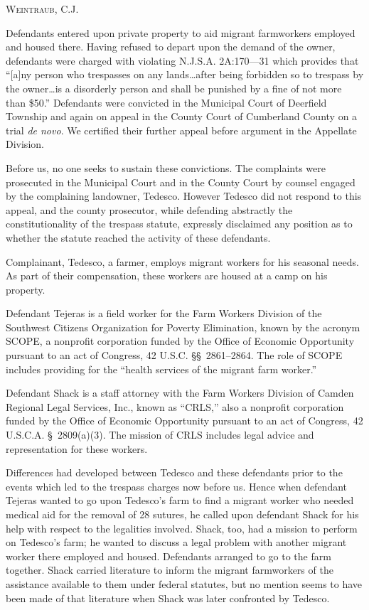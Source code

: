 
\opinion \textsc{Weintraub}, C.J.

Defendants entered upon private property to aid migrant farmworkers employed and
housed there. Having refused to depart upon the demand of the owner, defendants
were charged with violating N.J.S.A. 2A:170---31 which provides that ``[a]ny
person who trespasses on any lands\ldots after being forbidden so to trespass
by the owner\ldots is a disorderly person and shall be punished by a fine of
not more than \$50.'' Defendants were convicted in the Municipal Court of
Deerfield Township and again on appeal in the County Court of Cumberland County
on a trial \textit{de novo}. We certified their further appeal before argument
in the Appellate Division.

Before us, no one seeks to sustain these convictions. The complaints were
prosecuted in the Municipal Court and in the County Court by counsel engaged by
the complaining landowner, Tedesco. However Tedesco did not respond to this
appeal, and the county prosecutor, while defending abstractly the
constitutionality of the trespass statute, expressly disclaimed any position as
to whether the statute reached the activity of these defendants.

Complainant, Tedesco, a farmer, employs migrant workers for his seasonal needs.
As part of their compensation, these workers are housed at a camp on his
property.

Defendant Tejeras is a field worker for the Farm Workers Division of the
Southwest Citizens Organization for Poverty Elimination, known by the acronym
SCOPE, a nonprofit corporation funded by the Office of Economic Opportunity
pursuant to an act of Congress, 42 U.S.C. \S\S~2861--2864. The role of
SCOPE includes providing for the ``health services of the migrant farm
worker.''

Defendant Shack is a staff attorney with the Farm Workers Division of Camden
Regional Legal Services, Inc., known as ``CRLS,'' also a nonprofit corporation
funded by the Office of Economic Opportunity pursuant to an act of Congress, 42
U.S.C.A. \S~2809(a)(3). The mission of CRLS includes legal advice and
representation for these workers.

Differences had developed between Tedesco and these defendants prior to the
events which led to the trespass charges now before us. Hence when defendant
Tejeras wanted to go upon Tedesco's farm to find a migrant worker who needed
medical aid for the removal of 28 sutures, he called upon defendant Shack for
his help with respect to the legalities involved. Shack, too, had a mission to
perform on Tedesco's farm; he wanted to discuss a legal problem with another
migrant worker there employed and housed. Defendants arranged to go to the farm
together. Shack carried literature to inform the migrant farmworkers of the
assistance available to them under federal statutes, but no mention seems to
have been made of that literature when Shack was later confronted by Tedesco.

